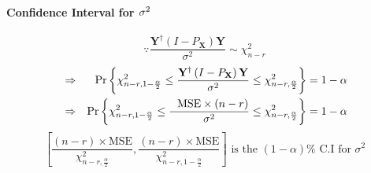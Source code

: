 \documentclass{article}
\begin{document}
\bigskip

\paragraph{Confidence Interval for $\protect\sigma ^{2}$}

\bigskip 

\begin{equation*}
\because \frac{\mathbf{Y}^{\dagger }\left( I-P_{\mathbf{X}}\right) \mathbf{Y}%
}{\sigma ^{2}}\sim \chi _{n-r}^{2}
\end{equation*}%
\begin{eqnarray*}
&\Rightarrow &\Pr \left\{ \chi _{n-r,1-\frac{\alpha }{2}}^{2}\leq \frac{%
\mathbf{Y}^{\dagger }\left( I-P_{\mathbf{X}}\right) \mathbf{Y}}{\sigma ^{2}}%
\leq \chi _{n-r,\frac{\alpha }{2}}^{2}\right\} =1-\alpha \\
&\Rightarrow &\Pr \left\{ \chi _{n-r,1-\frac{\alpha }{2}}^{2}\leq \frac{%
\text{MSE}\times \left( n-r\right) }{\sigma ^{2}}\leq \chi _{n-r,\frac{%
\alpha }{2}}^{2}\right\} =1-\alpha
\end{eqnarray*}%
\begin{equation*}
\left[ \frac{\left( n-r\right) \times \text{MSE}}{\chi _{n-r,\frac{\alpha }{2%
}}^{2}},\frac{\left( n-r\right) \times \text{MSE}}{\chi _{n-r,1-\frac{\alpha 
}{2}}^{2}}\right] \text{ is the }\left( 1-\alpha \right) \%\text{ C.I for }%
\sigma ^{2}
\end{equation*}
\end{document}

